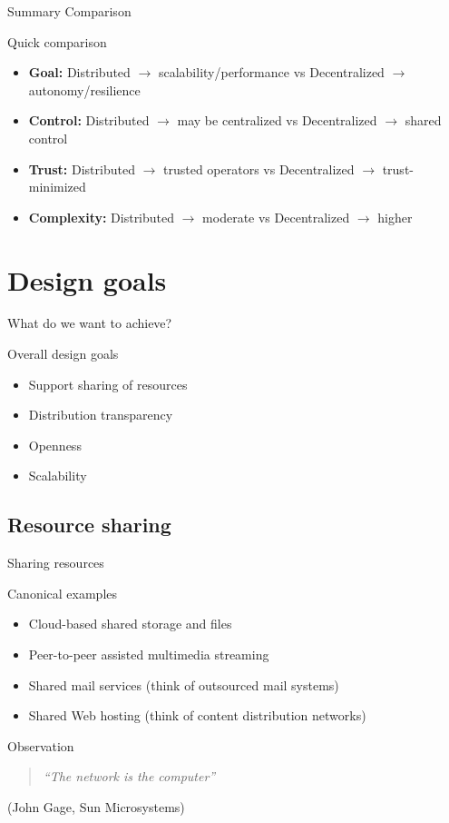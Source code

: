 \begin{frame}{Summary Comparison}
  \begin{block}{Quick comparison}
    \begin{itemize}
      \item \textbf{Goal:} Distributed $\rightarrow$ scalability/performance \quad vs \quad Decentralized $\rightarrow$ autonomy/resilience
      \item \textbf{Control:} Distributed $\rightarrow$ may be centralized \quad vs \quad Decentralized $\rightarrow$ shared control
      \item \textbf{Trust:} Distributed $\rightarrow$ trusted operators \quad vs \quad Decentralized $\rightarrow$ trust-minimized
      \item \textbf{Complexity:} Distributed $\rightarrow$ moderate \quad vs \quad Decentralized $\rightarrow$ higher
    \end{itemize}
  \end{block}
\end{frame}

\section{Design goals}
\begin{frame}{What do we want to achieve?}
  \begin{block}{Overall design goals}
    \begin{itemize}
      \item Support sharing of resources
      \item Distribution transparency
      \item Openness
      \item Scalability
    \end{itemize}
  \end{block}
\end{frame}
\subsection{Resource sharing}
\begin{frame}{Sharing resources}
  \begin{exampleblock}{Canonical examples}
    \begin{itemize}\firmlist
      \item Cloud-based shared storage and files
      \item Peer-to-peer assisted multimedia streaming
      \item Shared mail services (think of outsourced mail systems)
      \item Shared Web hosting (think of content distribution networks)
    \end{itemize}
  \end{exampleblock}
  \begin{block}{Observation}
    \begin{quote}\itshape
      ``The network is the computer''
    \end{quote}
    (John Gage, Sun Microsystems)
  \end{block}
\end{frame}
